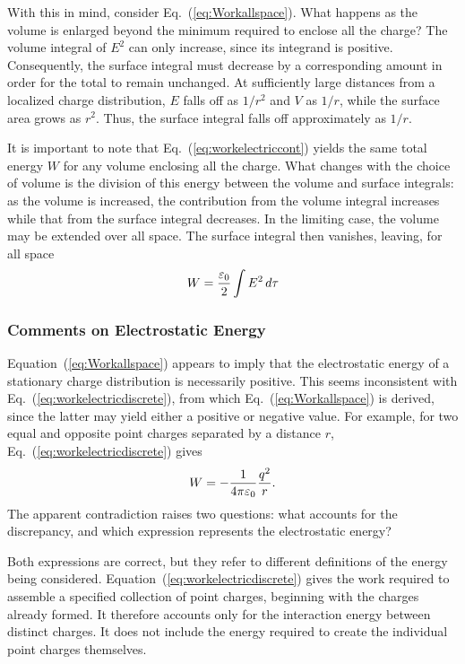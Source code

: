 		With this in mind, consider Eq.~(\ref{eq:Workallspace}). What happens
		as the volume is enlarged beyond the minimum required to enclose all the charge?
		The volume integral of $E^2$ can only increase, since its integrand is positive.
		Consequently, the surface integral must decrease by a corresponding amount in
		order for the total to remain unchanged. At sufficiently large distances from 
		a localized charge distribution, $E$ falls off as $1/r^2$ and $V$ as $1/r$, 
		while the surface area grows as $r^2$. Thus, the surface integral falls off 
		approximately as $1/r$.

		It is important to note that Eq.~(\ref{eq:workelectriccont}) yields the same
		total energy $W$ for any volume enclosing all the charge. What changes with 
		the choice of volume is the division of this energy between the volume and
		surface integrals: as the volume is increased, the contribution from the volume
		integral increases while that from the surface integral decreases. In the 
		limiting case, the volume may be extended over all space. The surface integral 
		then vanishes, leaving, for all space
		\begin{equation}
			\label{eq:Workallspace}
			W = \frac{\varepsilon_0}{2}\int E^2 \dd{\tau}
		\end{equation}

	\subsubsection{Comments on Electrostatic Energy}

			Equation~(\ref{eq:Workallspace}) appears to imply that the electrostatic energy
			of a stationary charge distribution is necessarily positive. This seems inconsistent
			with Eq.~(\ref{eq:workelectricdiscrete}), from which Eq.~(\ref{eq:Workallspace})
			is derived, since the latter may yield either a positive or negative value. For
			example, for two equal and opposite point charges separated by a distance $r$, 
			Eq.~(\ref{eq:workelectricdiscrete}) gives
			\[
				W
				=
				-\frac{1}{4\pi\varepsilon_0}\frac{q^2}{r}.
			\]
			The apparent contradiction raises two questions: what accounts for the discrepancy,
			and which expression represents the electrostatic energy?

			Both expressions are correct, but they refer to different definitions of the energy 
			being considered. Equation~(\ref{eq:workelectricdiscrete}) gives the work required 
			to assemble a specified collection of point charges, beginning with the charges already 
			formed. It therefore accounts only for the interaction energy between distinct charges. 
			It does not include the energy required to create the individual point charges themselves.

